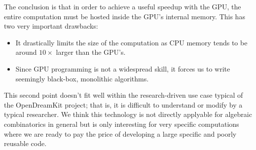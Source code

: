 \documentclass{deliverablereport}
\newcommand{\NN}{\mathbb{N}}
\begin{document}
The conclusion is that in order to achieve a useful speedup with the GPU, the entire computation
must be hosted inside the GPU's internal memory. This has two very important drawbacks:
\begin{itemize}
\item It drastically limits the size of the computation as CPU memory tends to
  be around $10\times$ larger than the GPU's.
\item Since GPU programming is not a widespread skill, it forces us to write
  seemingly black-box, monolithic algorithms.
\end{itemize}
This second point doesn't fit well within the research-driven use case
typical of the OpenDreamKit project; that is, it is difficult to understand
or modify by a typical researcher. %
We think this technology is not directly applyable for algebraic combinatorics
in general but  is only  interesting
for very specific computations where we are ready to pay the price of developing a large
specific and poorly reusable code.






\end{document}

